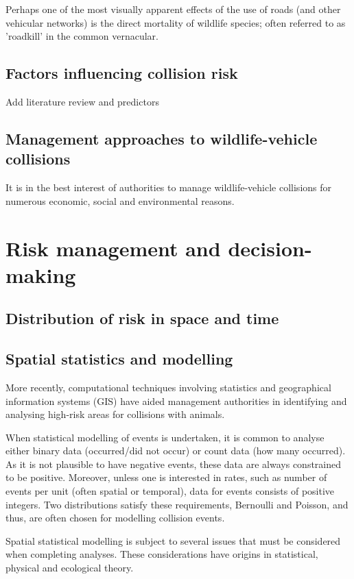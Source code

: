 Perhaps one of the most visually apparent effects of the use of roads (and other vehicular networks) is the direct mortality of wildlife species; often referred to as 'roadkill' in the common vernacular. 

\subsection{Factors influencing collision risk}

Add literature review and predictors

\subsection{Management approaches to wildlife-vehicle collisions}

It is in the best interest of authorities to manage wildlife-vehicle collisions for numerous economic, social and environmental reasons.

\section{Risk management and decision-making}

\subsection{Distribution of risk in space and time}

\subsection{Spatial statistics and modelling}

More recently, computational techniques involving statistics and geographical information systems (GIS) have aided management authorities in identifying and analysing high-risk areas for collisions with animals.

When statistical modelling of events is undertaken, it is common to analyse either binary data (occurred/did not occur) or count data (how many occurred).  As it is not plausible to have negative events, these data are always constrained to be positive.  Moreover, unless one is interested in rates, such as number of events per unit (often spatial or temporal), data for events consists of positive integers.  Two distributions satisfy these requirements, Bernoulli and Poisson, and thus, are often chosen for modelling collision events.

Spatial statistical modelling is subject to several issues that must be considered when completing analyses.  These considerations have origins in statistical, physical and ecological theory.

